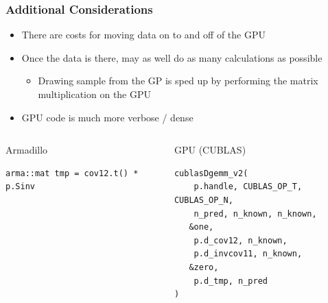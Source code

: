 \documentclass[slidestop,mathserif]{beamer}
\begin{document}

\begin{frame}[fragile]
\frametitle{Additional Considerations}

\begin{itemize}
\item There are costs for moving data on to and off of the GPU
\item Once the data is there, may as well do as many calculations as possible
\begin{itemize}
\item Drawing sample from the GP is sped up by performing the matrix multiplication on the GPU
\end{itemize}
\item GPU code is much more verbose / dense
\end{itemize}

\pause

{\scriptsize
\begin{columns}
\begin{block}{Armadillo}
\begin{verbatim}
arma::mat tmp = cov12.t() * p.Sinv
\end{verbatim}
\end{block}
\begin{block}{GPU (CUBLAS)}
\begin{verbatim}
cublasDgemm_v2( 
    p.handle, CUBLAS_OP_T, CUBLAS_OP_N,
    n_pred, n_known, n_known,
   &one,
    p.d_cov12, n_known,
    p.d_invcov11, n_known,
   &zero,
    p.d_tmp, n_pred
)
\end{verbatim}
\end{block}
\end{columns}
}

\end{frame}

\end{document}
